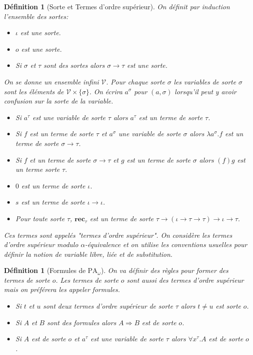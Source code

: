 \documentclass[a4paper,12pt]{article}
\newtheorem{defi}[theo]{Définition}
\theoremstyle{rmqstyle}
\newcommand{\set}[1]{\{#1\}}
\newcommand{\PA}{\mathrm{PA}}
\newcommand{\rec}{\mathbf{rec}}
\renewcommand{\implies}{\Rightarrow}
\begin{document}
\begin{defi}[Sorte et Termes d'ordre supérieur]
On définit par induction l'ensemble des sortes:
\begin{itemize}
\setlength\itemsep{ -1 em}
\item $\iota$ est une sorte.\\
\item $o$ est une sorte.\\
\item Si $\sigma$ et $\tau$ sont des sortes alors $\sigma \to \tau$ est une sorte.
\end{itemize}
On se donne un ensemble infini $\mathcal{V}$. Pour chaque sorte $\sigma$ les variables de sorte $\sigma$ sont les éléments de $\mathcal{V} \times \set{\sigma}$. On écrira $a^\sigma$ pour $(a, \sigma)$ lorsqu'il peut y avoir confusion sur la sorte de la variable. 
\begin{itemize}
\setlength\itemsep{ -1 em}
\item Si $a^\tau$ est une variable de sorte $\tau$ alors $a^\tau$ est un terme de sorte $\tau$.\\
\item Si $f$ est un terme de sorte $\tau$ et $a^\sigma$ une variable de sorte $\sigma$ alors $\lambda a^\sigma. f$ est un terme de sorte $\sigma \to \tau$.\\
\item Si $f$ et un terme de sorte $\sigma \to \tau$ et $g$ est un terme de sorte $\sigma$ alors $(f)g$ est un terme sorte $\tau$.\\
\item $0$ est un terme de sorte $\iota$.\\
\item $s$ est un terme de sorte $\iota \to \iota$.\\
\item Pour toute sorte $\tau$, $\rec_\tau$ est un terme de sorte $\tau \to ( \iota \to \tau \to \tau) \to \iota \to \tau$.
\end{itemize}
Ces termes sont appelés "termes d'ordre supérieur". On considère les termes d'ordre supérieur modulo $\alpha$-équivalence et on utilise les conventions usuelles pour définir la notion de variable libre, liée et de substitution. 
\end{defi}

\begin{defi}[Formules de $\PA_\omega$]
On va définir des règles pour former des termes de sorte $o$. Les termes de sorte $o$ sont aussi des termes d'ordre supérieur mais on préférera les appeler formules.
\begin{itemize}
\setlength\itemsep{ -1 em}
\item Si $t$ et $u$ sont deux termes d'ordre supérieur de sorte $\tau$ alors $t \neq u$ est sorte $o$.\\
\item Si $A$ et $B$ sont des formules alors $A \implies B$ est de sorte $o$.\\
\item Si $A$ est de sorte $o$ et $a^\tau$ est une variable de sorte $\tau$ alors $\forall x^\tau. A$ est de sorte $o$.
\end{itemize}
\end{defi}
\end{document}
